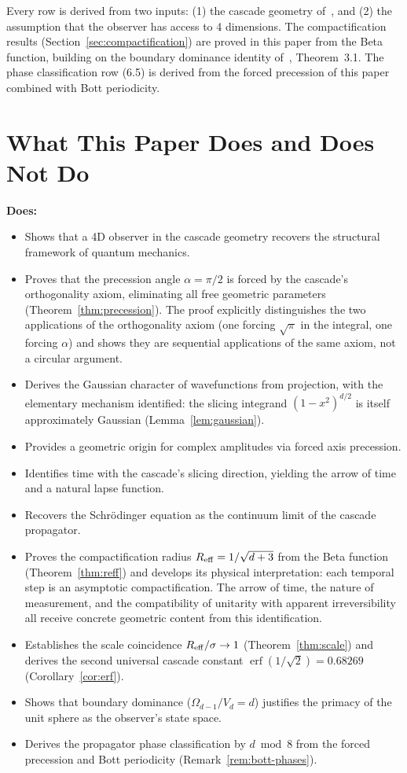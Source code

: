 \documentclass[12pt,a4paper]{article}
\begin{document}
Every row is derived from two inputs: (1) the cascade geometry of~\cite{paperI}, and
(2) the assumption that the observer has access to 4 dimensions. The compactification
results (Section~\ref{sec:compactification}) are proved in this paper from the Beta
function, building on the boundary dominance identity of~\cite{paperI}, Theorem~3.1.
The phase classification row (6.5) is derived from the forced precession of this paper
combined with Bott periodicity.

\section{What This Paper Does and Does Not Do}

\textbf{Does:}
\begin{itemize}
\item Shows that a 4D observer in the cascade geometry recovers the structural framework of
quantum mechanics.
\item Proves that the precession angle $\alpha=\pi/2$ is forced by the cascade's
orthogonality axiom, eliminating all free geometric parameters
(Theorem~\ref{thm:precession}). The proof explicitly distinguishes the two applications of
the orthogonality axiom (one forcing $\sqrt{\pi}$ in the integral, one forcing $\alpha$)
and shows they are sequential applications of the same axiom, not a circular argument.
\item Derives the Gaussian character of wavefunctions from projection, with the elementary
mechanism identified: the slicing integrand $(1-x^2)^{d/2}$ is itself approximately Gaussian
(Lemma~\ref{lem:gaussian}).
\item Provides a geometric origin for complex amplitudes via forced axis precession.
\item Identifies time with the cascade's slicing direction, yielding the arrow of time and
a natural lapse function.
\item Recovers the Schr\"{o}dinger equation as the continuum limit of the cascade propagator.
\item Proves the compactification radius $R_{\rm eff}=1/\sqrt{d+3}$ from the Beta function
(Theorem~\ref{thm:reff}) and develops its physical interpretation: each temporal step is an
asymptotic compactification. The arrow of time, the nature of measurement, and the
compatibility of unitarity with apparent irreversibility all receive concrete geometric
content from this identification.
\item Establishes the scale coincidence $R_{\rm eff}/\sigma\to 1$ (Theorem~\ref{thm:scale})
and derives the second universal cascade constant $\operatorname{erf}(1/\sqrt{2}) = 0.68269$
(Corollary~\ref{cor:erf}).
\item Shows that boundary dominance ($\Omega_{d-1}/V_d=d$) justifies the primacy of the
unit sphere as the observer's state space.
\item Derives the propagator phase classification by $d\bmod 8$ from the forced precession
and Bott periodicity (Remark~\ref{rem:bott-phases}).
\end{itemize}
\end{document}
